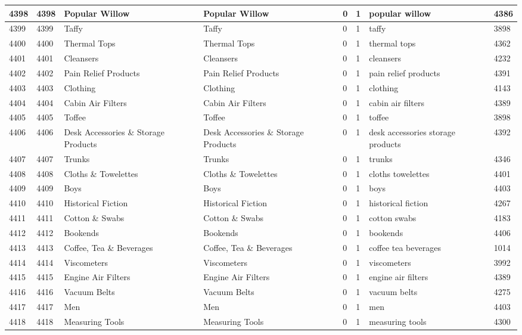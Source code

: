 \begin{longtable}{|l|l|l|l|l|l|l|l|}
4398 & 4398 & Popular Willow & Popular Willow & 0 & 1 & popular willow & 4386 \\ \hline 
4399 & 4399 & Taffy & Taffy & 0 & 1 & taffy & 3898 \\ \hline 
4400 & 4400 & Thermal Tops & Thermal Tops & 0 & 1 & thermal tops & 4362 \\ \hline 
4401 & 4401 & Cleansers & Cleansers & 0 & 1 & cleansers & 4232 \\ \hline 
4402 & 4402 & Pain Relief Products & Pain Relief Products & 0 & 1 & pain relief products & 4391 \\ \hline 
4403 & 4403 & Clothing & Clothing & 0 & 1 & clothing & 4143 \\ \hline 
4404 & 4404 & Cabin Air Filters & Cabin Air Filters & 0 & 1 & cabin air filters & 4389 \\ \hline 
4405 & 4405 & Toffee & Toffee & 0 & 1 & toffee & 3898 \\ \hline 
4406 & 4406 & Desk Accessories \& Storage Products & Desk Accessories \& Storage Products & 0 & 1 & desk accessories storage products & 4392 \\ \hline 
4407 & 4407 & Trunks & Trunks & 0 & 1 & trunks & 4346 \\ \hline 
4408 & 4408 & Cloths \& Towelettes & Cloths \& Towelettes & 0 & 1 & cloths towelettes & 4401 \\ \hline 
4409 & 4409 & Boys & Boys & 0 & 1 & boys & 4403 \\ \hline 
4410 & 4410 & Historical Fiction & Historical Fiction & 0 & 1 & historical fiction & 4267 \\ \hline 
4411 & 4411 & Cotton \& Swabs & Cotton \& Swabs & 0 & 1 & cotton swabs & 4183 \\ \hline 
4412 & 4412 & Bookends & Bookends & 0 & 1 & bookends & 4406 \\ \hline 
4413 & 4413 & Coffee, Tea \& Beverages & Coffee, Tea \& Beverages & 0 & 1 & coffee tea beverages & 1014 \\ \hline 
4414 & 4414 & Viscometers & Viscometers & 0 & 1 & viscometers & 3992 \\ \hline 
4415 & 4415 & Engine Air Filters & Engine Air Filters & 0 & 1 & engine air filters & 4389 \\ \hline 
4416 & 4416 & Vacuum Belts & Vacuum Belts & 0 & 1 & vacuum belts & 4275 \\ \hline 
4417 & 4417 & Men & Men & 0 & 1 & men & 4403 \\ \hline 
4418 & 4418 & Measuring Tools & Measuring Tools & 0 & 1 & measuring tools & 4300 \\ \hline 

\end{longtable}
